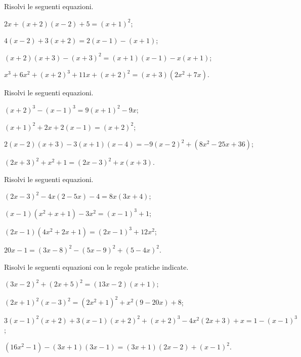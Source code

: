 \begin{esercizio}[\Ast]
\label{ese:15.18}
Risolvi le seguenti equazioni.
 \begin{enumeratea}
 \item $2x+(x+2)(x-2)+5=(x+1)^{2}$;
 \item $4(x-2)+3(x+2)=2(x-1)-(x+1)$;
 \item $(x+2)(x+3)-(x+3)^{2}=(x+1)(x-1)-x(x+1)$;
 \item $x^{3}+6x^{2}+(x+2)^{3}+11x+(x+2)^{2}=(x+3)\left(2x^{2}+7x\right)$.
 \end{enumeratea}
\end{esercizio}

\begin{esercizio}[\Ast]
\label{ese:15.19}
Risolvi le seguenti equazioni.
 \begin{enumeratea}
 \item $(x+2)^{3}-(x-1)^{3}=9(x+1)^{2}-9x$;
 \item $(x+1)^{2}+2x+2(x-1)=(x+2)^{2}$;
 \item $2(x-2)(x+3)-3(x+1)(x-4)=-9(x-2)^{2}+\left(8x^{2}-25x+36\right)$;
 \item $(2x+3)^{2}+x^{2}+1=(2x-3)^{2}+x(x+3)$.
 \end{enumeratea}
\end{esercizio}

\begin{esercizio}[\Ast]
\label{ese:15.20}
Risolvi le seguenti equazioni.
 \begin{enumeratea}
 \item $(2x-3)^{2}-4x(2-5x)-4=8x(3x+4)$;
 \item $(x-1)\left(x^{2}+x+1\right)-3x^{2}=(x-1)^{3}+1$;
 \item $(2x-1)\left(4x^{2}+2x+1\right)=(2x-1)^{3}+12x^{2}$;
 \item $20x-1=(3x-8)^{2}-(5x-9)^{2}+(5-4x)^{2}$.
 \end{enumeratea}
\end{esercizio}

\begin{esercizio}[\Ast] %
\label{ese:15.21}
Risolvi le seguenti equazioni con le regole pratiche indicate.
 \begin{enumeratea}
 \item $(3x-2)^{2}+(2x+5)^{2}=(13x-2)(x+1)$;
 \item $(2x+1)^{2}(x-3)^{2}=\left(2x^{2}+1\right)^{2}+x^{2}(9-20x)+8$;
 \item $3(x-1)^{2}(x+2)+3(x-1)(x+2)^{2}+(x+2)^{3}-4x^{2}(2x+3)+x=1-(x-1)^{3}$;
 \item $\left(16x^{2}-1\right)-(3x+1)(3x-1)=(3x+1)(2x-2)+(x-1)^{2}$.
 \end{enumeratea}
\end{esercizio}

